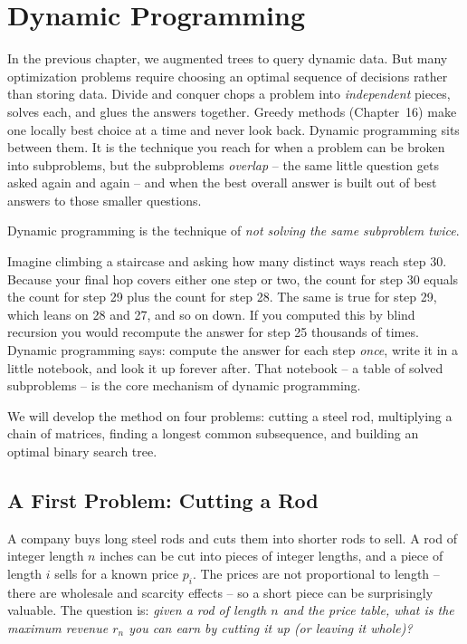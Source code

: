 \chapter{Dynamic Programming}
\label{ch15:dp}

In the previous chapter, we augmented trees to query dynamic data. But many optimization problems require choosing an optimal sequence of decisions rather than storing data. Divide and conquer chops a problem into \emph{independent}
pieces, solves each, and glues the answers together. Greedy methods (Chapter~16)
make one locally best choice at a time and never
look back. Dynamic programming sits between them. It is the technique you reach
for when a problem can be broken into subproblems, but the subproblems
\emph{overlap} -- the same little question gets asked again and again -- and
when the best overall answer is built out of best answers to those smaller
questions.

Dynamic programming is the technique of \emph{not solving the same subproblem twice}.

\begin{intuitionbox}
Imagine climbing a staircase and asking how many distinct ways reach step 30.
Because your final hop covers either one step or two, the count for step 30
equals the count for step 29 plus the count for step 28. The same is true
for step 29, which leans on 28 and 27, and so on down. If you computed this by
blind recursion you would recompute the answer for step 25 thousands of times.
Dynamic programming says: compute the answer for each step \emph{once}, write
it in a little notebook, and look it up forever after. That notebook -- a
table of solved subproblems -- is the core mechanism of dynamic programming.
\end{intuitionbox}

We will develop the method on four problems: cutting a
steel rod, multiplying a chain of matrices, finding a longest
common subsequence, and building an optimal binary search tree.

\section{A First Problem: Cutting a Rod}
\label{ch15:rod}

A company buys long steel rods and cuts them into shorter rods to sell. A rod
of integer length $n$ inches can be cut into pieces of integer lengths, and a
piece of length $i$ sells for a known price $p_i$. The prices are not
proportional to length -- there are wholesale and scarcity effects -- so a
short piece can be surprisingly valuable. The question is: \emph{given a rod of length $n$ and the price table,
what is the maximum revenue $r_n$ you can earn by cutting it up (or leaving it
whole)?}


